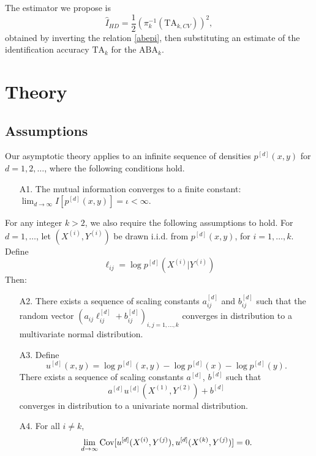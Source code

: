 The estimator we propose is
\begin{equation}\label{eq:hat_i_hd}
\hat{I}_{HD} = \frac{1}{2}(\pi_{k}^{-1}(\text{TA}_{k,CV}))^2,
\end{equation}
obtained by inverting the relation \eqref{abepi}, then substituting
an estimate of the identification accuracy $\text{TA}_k$ for the $\text{ABA}_k$.  

\section{Theory}

\subsection{Assumptions}\label{sec:ch5_assumptions}

Our asymptotic theory applies to an infinite sequence of densities
$p^{[d]}(x, y)$ for $d = 1,2,\hdots$, where the following conditions hold.

\begin{itemize}
\item[A1.] The mutual information converges to a finite constant: $\lim_{d \to \infty} I[p^{[d]}(x, y)] = \iota < \infty.$
\end{itemize}
For any integer $k > 2$, we also require the following assumptions to
hold.  For $d = 1,\hdots$, let $(X^{(i)}, Y^{(i)})$ be drawn
i.i.d. from $p^{[d]}(x, y)$, for $i = 1,\hdots, k$.  
Define \[\ell_{ij} = \log p^{[d]}(X^{(i)}|Y^{(i)})\]
Then:
\begin{itemize}
\item[A2.] There exists a sequence of scaling constants $a_{ij}^{[d]}$
and $b_{ij}^{[d]}$ such that the random vector $(a_{ij}\ell_{ij}^{[d]} +
b_{ij}^{[d]})_{i, j = 1,\hdots, k}$ converges in distribution to a
multivariate normal distribution.
\item[A3.] Define \[
u^{[d]}(x, y) = \log p^{[d]}(x, y) - \log p^{[d]}(x) - \log p^{[d]}(y).
\]
There exists a sequence of scaling constants $a^{[d]}$, $b^{[d]}$ such that
\[
a^{[d]}u^{[d]}(X^{(1)}, Y^{(2)}) + b^{[d]}
\]
converges in distribution to a univariate normal distribution.
\item[A4.] For all $i \neq k$,
\[\lim_{d \to \infty}\text{Cov}[u^{[d]}(X^{(i)}, Y^{(j)}), u^{[d]}(X^{(k)}, Y^{(j)})] = 0.\]
\end{itemize}

